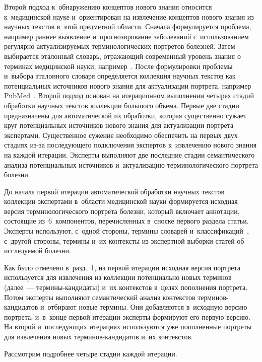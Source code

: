 \begin{multicols}{2}
  Второй подход к~обнаружению концептов нового знания относится 
к~медицинской науке и~ориентирован на извлечение концептов нового 
знания из научных текстов в~этой предметной области. Сначала 
формулируется проблема, например раннее выявление и~прогнозирование 
заболеваний с~использованием регулярно актуализируемых 
терминологических портретов болезней. Затем выбирается эталонный 
словарь, отражающий современный уровень знания о терминах медицинской 
науки, например~\cite{8-z}. После формулировки проблемы и~выбора 
эталонного словаря определяется коллекция научных текстов как 
потенциальных источников нового знания для актуализации портрета, 
например PubMed~\cite{10-z}. Второй подход основан на итерационном 
выполнении четырех стадий обработки научных текстов коллекции большого 
объема. Первые две стадии предназначены для автоматической их обработки, 
которая существенно сужает круг потенциальных источников нового знания 
для актуализации портрета экспертами. Существенное сужение необходимо 
обеспечить на первых двух стадиях из-за последующего подключения 
экспертов к~извлечению нового знания на каждой итерации. Эксперты 
выполняют две последние стадии семантического анализа потенциальных 
источников и~актуализацию терминологического портрета болезни.
  
  До начала первой итерации автоматической обработки научных текстов 
коллекции экспертами в~области медицинской науки формируется исходная 
версия терминологического портрета болезни, который включает аннотации, 
состоящие из~6~компонентов, перечисленных в~сноске первого раздела 
статьи. Эксперты используют, с~одной стороны, термины словарей 
и~классификаций~\cite{7-z, 8-z, 9-z, 17-z}, с~другой стороны, термины и~их 
контексты из экспертной выборки статей об исследуемой болезни. 
  
  Как было отмечено в~разд.~1, на первой итерации исходная версия 
портрета используется для извлечения из коллекции потенциально новых 
терминов (далее~--- тер\-ми\-ны-кан\-ди\-да\-ты) и~их контекстов в~целях 
пополнения портрета. Потом эксперты выполняют семантический анализ 
контекстов тер\-ми\-нов-кан\-ди\-да\-тов и~отбирают новые термины. Они 
добавляются в~исходную версию портрета, и~в~конце первой итерации 
эксперты формируют его первую версию. На второй и~последующих 
итерациях используются уже пополненные портреты для извлечения новых 
тер\-ми\-нов-кан\-ди\-да\-тов и~их контекстов. 

Рассмотрим подробнее четыре стадии 
каждой итерации.
  

\end{multicols}
